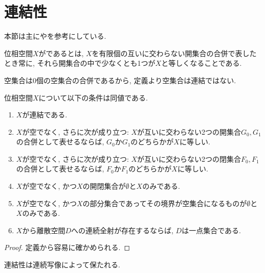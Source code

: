 \documentclass[uplatex, dvipdfmx, a4paper, 12pt, class=jsbook, crop=false]{standalone}
\begin{document}
\section{連結性}
\label{sec:connected-spaces}

\begin{source}
	本節は主に\cite[Chapter 6]{Engelking1989GT}や\cite[第４章]{Morita1981ja}を参考にしている.
\end{source}

\begin{definition}
	位相空間$ X $がであるとは, $ X $を有限個の互いに交わらない開集合の合併で表したとき常に,
	それら開集合の中で少なくとも1つが$ X $と等しくなることである.
\end{definition}

空集合は0個の空集合の合併であるから, 定義より空集合は連結ではない.

\begin{proposition}
	\label{prop:Characterization of connectedness}
	位相空間$ X $について以下の条件は同値である.
		\begin{enumerate}
			\item $ X $が連結である.
			\item $ X $が空でなく, さらに次が成り立つ: $ X $が互いに交わらない2つの開集合$ G_0, G_1 $の合併として表せるならば,
			      $ G_0 $か$ G_1 $のどちらかが$ X $に等しい.
			\item $ X $が空でなく, さらに次が成り立つ: $ X $が互いに交わらない2つの閉集合$ F_0, F_1 $の合併として表せるならば,
			$ F_0 $か$ F_1 $のどちらかが$ X $に等しい.
			\item $ X $が空でなく, かつ$ X $の開閉集合が$ \emptyset $と$ X $のみである.
			\item $ X $が空でなく, かつ$ X $の部分集合であってその境界が空集合になるものが$ \emptyset $と$ X $のみである.
			\item $ X $から離散空間$ D $への連続全射が存在するならば, $ D $は一点集合である.
		\end{enumerate}
\end{proposition}

\begin{proof}
	定義から容易に確かめられる.
\end{proof}

\begin{proposition}
	\label{prop:Continuous maps preserve connectedness}
	連結性は連続写像によって保たれる.
\end{proposition}
\end{document}
